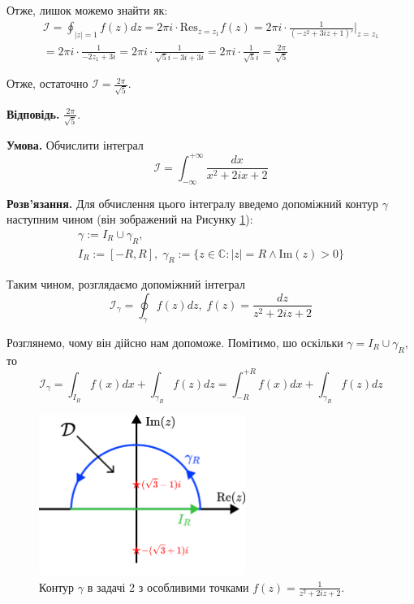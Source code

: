 \documentclass[oneside,solution]{karazin-complan-assign}
\begin{document}
Отже, лишок можемо знайти як:
\begin{gather}
    \mathcal{I}=\oint_{|z|=1}f(z)dz = 2\pi i \cdot  \text{Res}_{z=z_1}f(z) = 2\pi i \cdot \frac{1}{(-z^2+3iz+1)'}\Big|_{z=z_1} \nonumber \\
    = 2\pi i \cdot \frac{1}{-2z_1+3i} = 2\pi i \cdot \frac{1}{\sqrt{5}i - 3i + 3i} = 2\pi i \cdot \frac{1}{\sqrt{5}i} = \frac{2\pi}{\sqrt{5}}
\end{gather}

Отже, остаточно $\boxed{\mathcal{I} = \frac{2\pi}{\sqrt{5}}}$.

\textbf{Відповідь.} $\frac{2\pi}{\sqrt{5}}$. 

\problem{}

\textbf{Умова.} Обчислити інтеграл
\begin{equation*}
    \mathcal{I} = \int_{-\infty}^{+\infty} \frac{dx}{x^2+2ix+2}
\end{equation*}

\textbf{Розв'язання.} Для обчислення цього інтегралу введемо допоміжний контур $\gamma$ наступним чином (він зображений на Рисунку \ref{fig:contour}):
\begin{gather}
    \gamma := I_R \cup \gamma_R, \\ I_R := [-R,R], \; \gamma_R := \{z \in \mathbb{C}: |z| = R \wedge \text{Im}(z) > 0\}
\end{gather}

Таким чином, розглядаємо допоміжний інтеграл
\begin{equation}
    \mathcal{I}_{\gamma} = \oint_{\gamma} f(z)dz, \; f(z) = \frac{dz}{z^2 + 2iz + 2}
\end{equation}

Розглянемо, чому він дійсно нам допоможе. Помітимо, шо оскільки $\gamma = I_R \cup \gamma_R$, то
\begin{equation}
    \mathcal{I}_{\gamma} = \int_{I_R} f(x)dx + \int_{\gamma_R} f(z)dz = \int_{-R}^{+R} f(x)dx + \int_{\gamma_R} f(z)dz
\end{equation}

\begin{figure}
    \centering
    \includegraphics[width=0.6\textwidth]{images/hw_2/contour.pdf}
    \caption{Контур $\gamma$ в задачі 2 з особливими точками $f(z) = \frac{1}{z^2+2iz+2}$.}
    \label{fig:contour}
\end{figure}
\end{document}
